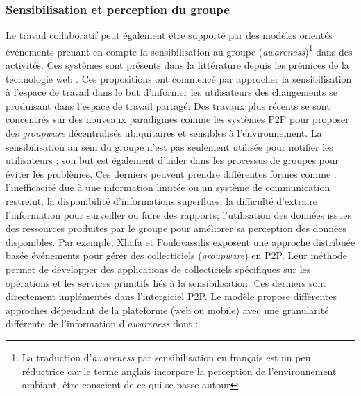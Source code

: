 \subsubsection{Sensibilisation et perception du groupe}
Le travail collaboratif peut également être supporté par des modèles orientés 
événements prenant en compte la sensibilisation au groupe (\textit{awareness})\footnote{La traduction d'\textit{awareness} par sensibilisation en français est un peu réductrice car le terme anglais incorpore la perception de l'environnement ambiant, être conscient de ce qui se passe autour} 
dans des activités. Ces systèmes sont présents dans la littérature depuis les 
prémices de la technologie web \cite{Bentley1997,Steinfield1999,You2001}. Ces 
propositions ont commencé par approcher la sensibilisation à l'espace de travail 
dans le but d'informer les utilisateurs des changements se produisant dans 
l'espace 
de travail partagé. 
Des travaux plus récents se sont concentrés sur des 
nouveaux paradigmes comme les systèmes \gls{P2P} pour proposer des 
\textit{groupware} décentralisés ubiquitaires et sensibles à l'environnement. La 
sensibilisation au sein du groupe n'est pas seulement utilisée 
pour notifier les utilisateurs ; son but est également d'aider dans les processus de 
groupes pour éviter les problèmes. Ces derniers peuvent prendre différentes 
formes comme :  l'inefficacité due à une information limitée ou un 
système de communication restreint; la disponibilité d'informations superflues; la difficulté 
d'extraire l'information pour surveiller ou faire des rapports; l'utilisation des 
données issues des ressources produites par le groupe pour améliorer sa 
perception des données disponibles. Par exemple, Xhafa et Poulovassilis 
\cite{Xhafa2010} exposent une approche distribuée basée événements pour gérer 
des collecticiels (\textit{groupware}) en \gls{P2P}. 
Leur méthode permet de développer des applications de collecticiels spécifiques  
sur les opérations et les services primitifs liés à la sensibilisation. Ces derniers 
sont directement implémentés dans l'intergiciel \gls{P2P}. Le modèle propose 
différentes approches dépendant de la plateforme (web ou mobile) avec une 
granularité différente de l'information 
d'\textit{awareness} dont :

